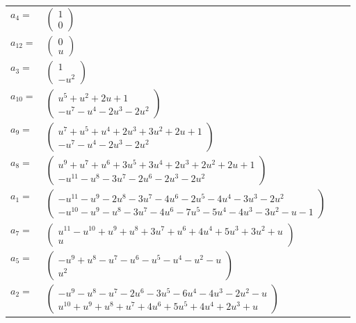 \documentclass[1p]{elsarticle_modified}
\theoremstyle{definition}
\begin{document}
\begin{tabular}{m{7pt} m{180pt} m{7pt} m{180pt} }
\flushright $a_{4}=$&$\begin{pmatrix}1\\0\end{pmatrix}$ \\
\flushright $a_{12}=$&$\begin{pmatrix}0\\u\end{pmatrix}$ \\
\flushright $a_{3}=$&$\begin{pmatrix}1\\- u^2\end{pmatrix}$ \\
\flushright $a_{10}=$&$\begin{pmatrix}u^5+u^2+2 u+1\\- u^7- u^4-2 u^3-2 u^2\end{pmatrix}$ \\
\flushright $a_{9}=$&$\begin{pmatrix}u^7+u^5+u^4+2 u^3+3 u^2+2 u+1\\- u^7- u^4-2 u^3-2 u^2\end{pmatrix}$ \\
\flushright $a_{8}=$&$\begin{pmatrix}u^9+u^7+u^6+3 u^5+3 u^4+2 u^3+2 u^2+2 u+1\\- u^{11}- u^8-3 u^7-2 u^6-2 u^3-2 u^2\end{pmatrix}$ \\
\flushright $a_{1}=$&$\begin{pmatrix}- u^{11}- u^9-2 u^8-3 u^7-4 u^6-2 u^5-4 u^4-3 u^3-2 u^2\\- u^{10}- u^9- u^8-3 u^7-4 u^6-7 u^5-5 u^4-4 u^3-3 u^2- u-1\end{pmatrix}$ \\
\flushright $a_{7}=$&$\begin{pmatrix}u^{11}- u^{10}+u^9+u^8+3 u^7+u^6+4 u^4+5 u^3+3 u^2+u\\u\end{pmatrix}$ \\
\flushright $a_{5}=$&$\begin{pmatrix}- u^9+u^8- u^7- u^6- u^5- u^4- u^2- u\\u^2\end{pmatrix}$ \\
\flushright $a_{2}=$&$\begin{pmatrix}- u^9- u^8- u^7-2 u^6-3 u^5-6 u^4-4 u^3-2 u^2- u\\u^{10}+u^9+u^8+u^7+4 u^6+5 u^5+4 u^4+2 u^3+u\end{pmatrix}$ \\

\end{tabular}
\end{document}
